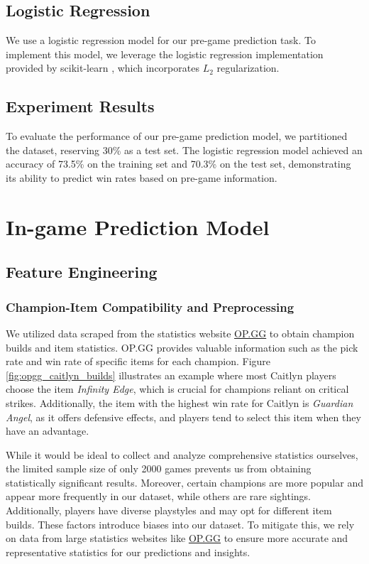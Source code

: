 \documentclass[11pt,a4paper,oneside]{report}
\begin{document}
\subsection{Logistic Regression}

We use a logistic regression model for our pre-game prediction task. To implement this model, we leverage the logistic regression implementation provided by scikit-learn \cite{sklearn-logistic-regression}, which incorporates $L_2$ regularization.

\subsection{Experiment Results}

To evaluate the performance of our pre-game prediction model, we partitioned the dataset, reserving 30\% as a test set. The logistic regression model achieved an accuracy of 73.5\% on the training set and 70.3\% on the test set, demonstrating its ability to predict win rates based on pre-game information.

\section{In-game Prediction Model}
\label{sec:in-game_prediction_model}

\subsection{Feature Engineering}
\subsubsection{Champion-Item Compatibility and Preprocessing}
\label{sec:embedding}
We utilized data scraped from the statistics website \href{https://www.op.gg/}{OP.GG} to obtain champion builds and item statistics. OP.GG provides valuable information such as the pick rate and win rate of specific items for each champion. Figure \ref{fig:opgg_caitlyn_builds} illustrates an example where most Caitlyn players choose the item \textit{Infinity Edge}, which is crucial for champions reliant on critical strikes. Additionally, the item with the highest win rate for Caitlyn is \textit{Guardian Angel}, as it offers defensive effects, and players tend to select this item when they have an advantage.

While it would be ideal to collect and analyze comprehensive statistics ourselves, the limited sample size of only 2000 games prevents us from obtaining statistically significant results. Moreover, certain champions are more popular and appear more frequently in our dataset, while others are rare sightings. Additionally, players have diverse playstyles and may opt for different item builds. These factors introduce biases into our dataset. To mitigate this, we rely on data from large statistics websites like \href{https://www.op.gg/}{OP.GG} to ensure more accurate and representative statistics for our predictions and insights.
\end{document}
